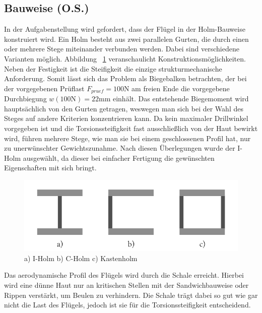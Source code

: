 \subsection{Bauweise (O.S.)}
In der Aufgabenstellung wird gefordert, dass der Flügel in der Holm-Bauweise konstruiert wird. Ein Holm besteht aus zwei parallelen Gurten, die durch einen oder mehrere Stege miteinander verbunden werden. Dabei sind verschiedene Varianten möglich. Abbildung ~\ref{fig: Holmarten} veranschaulicht Konstruktionsmöglichkeiten. Neben der Festigkeit ist die Steifigkeit die einzige strukturmechanische Anforderung. Somit lässt sich das Problem als Biegebalken betrachten, der bei der vorgegebenen Prüflast $ F_{pruef}=100\mathrm{N} $ am freien Ende die vorgegebene Durchbiegung $ w(100\mathrm{N})=22\mathrm{mm} $ einhält. Das entstehende Biegemoment wird hauptsächlich von den Gurten getragen, weswegen man sich bei der Wahl des Steges auf andere Kriterien konzentrieren kann. Da kein maximaler Drillwinkel vorgegeben ist und die Torsionssteifigkeit fast ausschließlich von der Haut bewirkt wird, führen mehrere Stege, wie man sie bei einem geschlossenen Profil hat, nur zu unerwünschter Gewichtszunahme. Nach diesen Überlegungen wurde der I-Holm ausgewählt, da dieser bei einfacher Fertigung die gewünschten Eigenschaften mit sich bringt.
\begin{figure}
	\includegraphics[width=1.0\textwidth]{Bilder/Holmarten.png}
	\caption{a) I-Holm   b) C-Holm    c) Kastenholm}
	\label{fig: Holmarten}
\end{figure} 
Das aerodynamische Profil des Flügels wird durch die Schale erreicht. Hierbei wird eine dünne Haut nur an kritischen Stellen mit der Sandwichbauweise oder Rippen verstärkt, um Beulen zu verhindern. Die Schale trägt dabei so gut wie gar nicht die Last des Flügels, jedoch ist sie für die Torsionssteifigkeit entscheidend.
